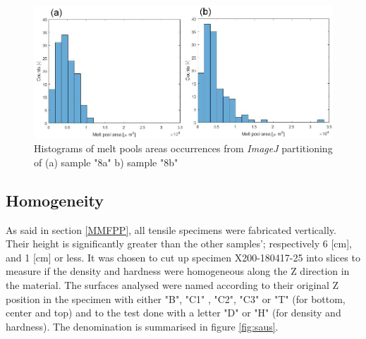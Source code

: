 \begin{figure}[ht]
\centering
\centerline{\includegraphics[scale=0.7]{Images/HistB1}}
\decoRule
\caption[Histograms of melt pools areas occurrences from \textit{ImageJ} partitioning of (a) sample "8a"  b) sample "8b"]{Histograms of melt pools areas occurrences from \textit{ImageJ} partitioning of (a) sample "8a"  b) sample "8b"}
\label{fig:HistB1}
\end{figure} 

 \begin{center}
\begin{table}[ht]
\noindent{}

\caption[Summary of the melt pools areas distributions for samples "8a" and "8b"]{Summary of the melt pools areas distributions for samples "8a" and "8b"}
\label{tab:tracMAB}
\end{table}
 \end{center}

\subsection{Homogeneity}
As said in section \ref{MMFPP}, all tensile specimens were fabricated vertically. Their height is significantly greater than the other samples'; respectively 6 [cm], and 1 [cm] or less. It was chosen to cut up specimen X200-180417-25 into slices to measure if the density and hardness were homogeneous along the Z direction in the material. The surfaces analysed were named according to their original Z position in the specimen with either "B", "C1" , "C2", "C3" or "T" (for bottom, center and top) and to the test done with a letter "D" or "H"  (for density and hardness). The denomination is summarised in figure \ref{fig:saus}.\\

